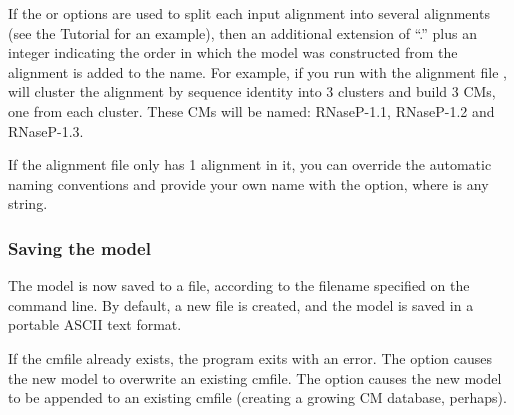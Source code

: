 If the  or  options are used to
split each input alignment into several alignments (see the
Tutorial for an example), then an additional extension of ``.''
plus an integer indicating the order in which the model was
constructed from the alignment is added to the name. For example, if
you run  with the alignment file
,  will cluster the alignment by
sequence identity into 3 clusters and build 3 CMs, one from each
cluster. These CMs will be named: RNaseP-1.1, RNaseP-1.2 and RNaseP-1.3.

If the alignment file only has 1 alignment in it, you can override the
automatic naming conventions and provide your own name with the 
option, where  is any string. 

\subsubsection{Saving the model}

The model is now saved to a file, according to the filename specified
on the command line. By default, a new file is created, and the model
is saved in a portable ASCII text format.

If the cmfile already exists, the program exits with an error. The
 option causes the new model to overwrite an existing
cmfile. The  option causes the new model to be appended to
an existing cmfile (creating a growing CM database, perhaps).

